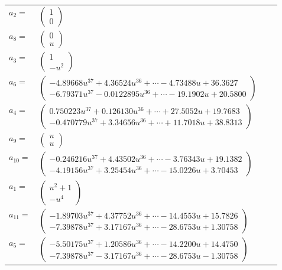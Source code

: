 \documentclass[1p]{elsarticle_modified}
\theoremstyle{definition}
\begin{document}
\begin{tabular}{m{7pt} m{180pt} m{7pt} m{180pt} }
\flushright $a_{2}=$&$\begin{pmatrix}1\\0\end{pmatrix}$ \\
\flushright $a_{8}=$&$\begin{pmatrix}0\\u\end{pmatrix}$ \\
\flushright $a_{3}=$&$\begin{pmatrix}1\\- u^2\end{pmatrix}$ \\
\flushright $a_{6}=$&$\begin{pmatrix}-4.89668 u^{37}+4.36524 u^{36}+\cdots-4.73488 u+36.3627\\-6.79371 u^{37}-0.0122895 u^{36}+\cdots-19.1902 u+20.5800\end{pmatrix}$ \\
\flushright $a_{4}=$&$\begin{pmatrix}0.750223 u^{37}+0.126130 u^{36}+\cdots+27.5052 u+19.7683\\-0.470779 u^{37}+3.34656 u^{36}+\cdots+11.7018 u+38.8313\end{pmatrix}$ \\
\flushright $a_{9}=$&$\begin{pmatrix}u\\u\end{pmatrix}$ \\
\flushright $a_{10}=$&$\begin{pmatrix}-0.246216 u^{37}+4.43502 u^{36}+\cdots-3.76343 u+19.1382\\-4.19156 u^{37}+3.25454 u^{36}+\cdots-15.0226 u+3.70453\end{pmatrix}$ \\
\flushright $a_{1}=$&$\begin{pmatrix}u^2+1\\- u^4\end{pmatrix}$ \\
\flushright $a_{11}=$&$\begin{pmatrix}-1.89703 u^{37}+4.37752 u^{36}+\cdots-14.4553 u+15.7826\\-7.39878 u^{37}+3.17167 u^{36}+\cdots-28.6753 u+1.30758\end{pmatrix}$ \\
\flushright $a_{5}=$&$\begin{pmatrix}-5.50175 u^{37}+1.20586 u^{36}+\cdots-14.2200 u+14.4750\\-7.39878 u^{37}-3.17167 u^{36}+\cdots-28.6753 u-1.30758\end{pmatrix}$ \\

\end{tabular}
\end{document}
